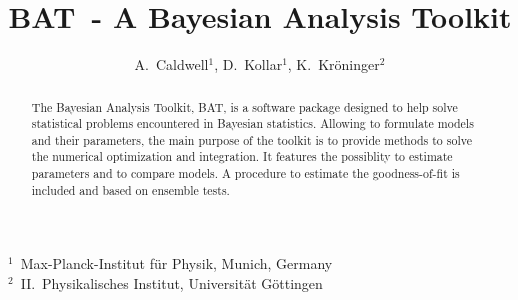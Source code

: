 \documentclass[11pt, a4paper]{article}
\newcommand{\BAT}{{\sc BAT}}
\begin{document}

\thispagestyle{empty} 

\begin{figure}
\end{figure} 

\title{\BAT\ - A {\sc Bayesian Analysis Toolkit}} 

\author{A.~Caldwell$^{1}$, D.~Kollar${^1}$, K.~Kr\"oninger$^{2}$} 

\maketitle

\begin{center}
$^{1}$~Max-Planck-Institut f\"ur Physik, Munich, Germany \\ 
$^{2}$~II.~Physikalisches Institut, Universit\"at G\"ottingen \\ 
\end{center}

\thispagestyle{empty} 

\begin{abstract} 
The Bayesian Analysis Toolkit, \BAT, is a software package designed to
help solve statistical problems encountered in Bayesian
statistics. Allowing to formulate models and their parameters, the
main purpose of the toolkit is to provide methods to solve the
numerical optimization and integration. It features the possiblity to
estimate parameters and to compare models. A procedure to estimate the
goodness-of-fit is included and based on ensemble tests. 
\end{abstract} 
\end{document}
